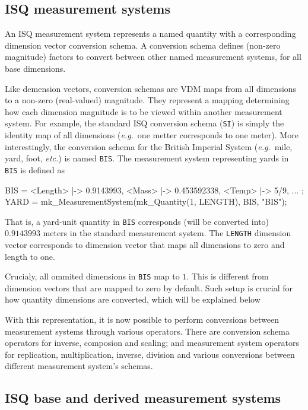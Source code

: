 \documentclass[runningheads,a4paper]{llncs}
\begin{document}
\subsection*{ISQ measurement systems}

An ISQ measurement system represents a named quantity with a corresponding dimension vector conversion schema. A conversion schema defines (non-zero magnitude) factors to convert between other named measurement systems, for all base dimensions. 

Like demension vectors, conversion schemas are VDM maps from all dimensions to a non-zero (real-valued) magnitude.    
They represent a mapping determining how each dimension magnitude is to be viewed within another measurement system. For example, the standard ISQ conversion schema (\texttt{SI}) is simply the identity map of all dimensions (\textit{e.g.}~one metter corresponds to one meter). More interestingly, the conversion schema for the British Imperial System (\textit{e.g.}~mile, yard, foot, \textit{etc.}) is named \texttt{BIS}. The measurement system representing yards in \texttt{BIS} is defined as     
%
\begin{vdmsl}[frame=none,basicstyle=\ttfamily\scriptsize]
  BIS  = { <Length> |-> 0.9143993, <Mass> |-> 0.453592338, <Temp> |-> 5/9, ... };
  YARD = mk_MeasurementSystem(mk_Quantity(1, LENGTH), BIS, "BIS");
\end{vdmsl}          
%
\noindent That is, a yard-unit quantity in \texttt{BIS} corresponds (will be converted into) \(0.9143993\) meters in the standard measurement system. The \texttt{LENGTH} dimension vector corresponds to dimension vector that maps all dimensions to zero and length to one.    

Crucialy, all ommited dimensions in \texttt{BIS} map to \(1\). This is different from dimension vectors that are mapped to zero by default. Such setup is crucial for how quantity dimensions are converted, which will be explained below

With this representation, it is now possible to perform conversions between measurement systems through various operators. There are conversion schema operators for inverse, composion and scaling; and measurement system operators for replication, multiplication, inverse, division and various conversions between different measurement system's schemas. 

\subsection*{ISQ base and derived measurement systems}
\end{document}
